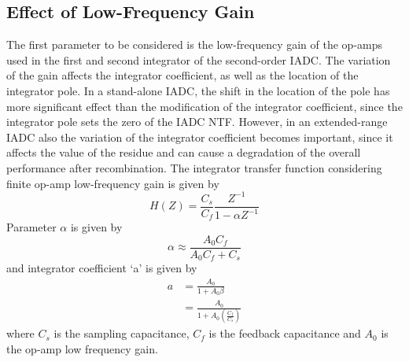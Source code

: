 \subsection{Effect of Low-Frequency Gain}
The first parameter to be considered is the low-frequency gain of the op-amps used in the first and second integrator of the second-order IADC. The variation of the gain affects the integrator coefficient, as well as the location of the integrator pole. In a stand-alone IADC, the shift in the location of the pole has more significant effect than the modification of the integrator coefficient, since the integrator pole sets the zero of the IADC NTF. However, in an extended-range IADC also the variation of the integrator coefficient becomes important, since it affects the value of the residue and can cause a degradation of the overall performance after recombination. The integrator transfer function considering finite op-amp low-frequency gain is given by \cite{TCAS_MALCOVATI} 
\begin{equation}
    H(Z)=\frac{C_s}{C_f}\frac{Z^{-1}}{1-\alpha Z^{-1}}
\end{equation}
Parameter $\alpha$ is given by
\begin{equation}
    \alpha\approx\frac{A_0C_f}{A_0C_f+C_s}
\end{equation}
and integrator coefficient `a' is given by
\begin{equation}
\begin{split}
    a &= \frac{A_0}{1+A_0\beta}\\
      &= \frac{A_0}{1+A_0\left(\frac{C_f}{C_s}\right)}
    \label{INTEG_COEFF}
\end{split}
\end{equation}
where $C_s$ is the sampling capacitance, $C_f$ is the feedback capacitance and $A_0$ is the op-amp low frequency gain.


